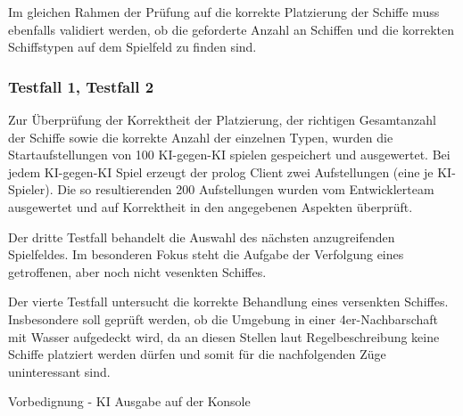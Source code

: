 	Im gleichen Rahmen der Prüfung auf die korrekte Platzierung der Schiffe muss ebenfalls validiert werden, ob die geforderte Anzahl an Schiffen und die
	korrekten Schiffstypen auf dem Spielfeld zu finden sind.

	\subsubsection{Testfall 1, Testfall 2} %
	\label{ssub:testfall_1_testfall_2}
		Zur Überprüfung der Korrektheit der Platzierung, der richtigen Gesamtanzahl der Schiffe sowie die korrekte Anzahl der einzelnen Typen, wurden 
		die Startaufstellungen von 100 KI-gegen-KI spielen gespeichert und ausgewertet. Bei jedem KI-gegen-KI Spiel erzeugt der prolog Client zwei 
		Aufstellungen (eine je KI-Spieler). Die so resultierenden 200 Aufstellungen wurden vom Entwicklerteam ausgewertet und auf Korrektheit in den 
		angegebenen Aspekten überprüft.
	
	Der dritte Testfall behandelt die Auswahl des nächsten anzugreifenden Spielfeldes. Im besonderen Fokus steht die Aufgabe der Verfolgung eines 
	getroffenen, aber noch nicht vesenkten Schiffes.
	
	Der vierte Testfall untersucht die korrekte Behandlung eines versenkten Schiffes. Insbesondere soll geprüft werden, ob die Umgebung in einer 4er-Nachbarschaft
	mit Wasser aufgedeckt wird, da an diesen Stellen laut Regelbeschreibung keine Schiffe platziert werden dürfen und somit für die nachfolgenden Züge uninteressant sind.
	
	Vorbedignung - KI Ausgabe auf der Konsole
     
